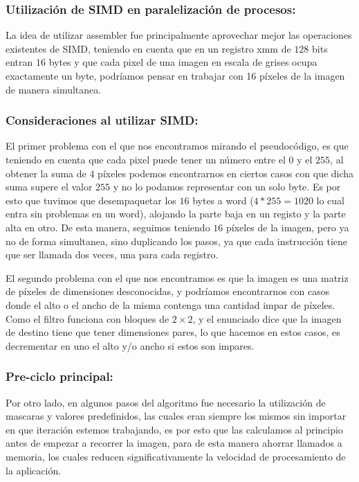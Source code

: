 \subsubsection{Utilización de SIMD en paralelización de procesos:}

La idea de utilizar assembler fue principalmente aprovechar mejor las operaciones existentes de SIMD, teniendo en cuenta que en un registro xmm de $128$ bits entran $16$ bytes y que cada pixel de una imagen en escala de grises ocupa exactamente un byte, podríamos pensar en trabajar con 16 píxeles de la imagen de manera simultanea. 


\subsubsection{Consideraciones al utilizar SIMD:}

El primer problema con el que nos encontramos mirando el pseudocódigo, es que teniendo en cuenta que cada pixel puede tener un número entre el $0$ y el $255$, al obtener la suma de $4$ píxeles podemos encontrarnos en ciertos casos con que dicha suma supere el valor $255$ y no lo podamos representar con un solo byte. Es por esto que tuvimos que desempaquetar los $16$ bytes a word ($4*255 = 1020$ lo cual entra sin problemas en un word), alojando la parte baja en un registo y la parte alta en otro. De esta manera, seguimos teniendo $16$ píxeles de la imagen, pero ya no de forma simultanea, sino duplicando los pasos, ya que cada instrucción tiene que ser llamada dos veces, una para cada registro.

El segundo problema con el que nos encontramos es que la imagen es una matriz de píxeles de dimensiones desconocidas, y podríamos encontrarnos con casos donde el alto o el ancho de la misma contenga una cantidad impar de píxeles. Como el filtro funciona con bloques de $2 \times 2$, y el enunciado dice que la imagen de destino tiene que tener dimensiones pares, lo que hacemos en estos casos, es decrementar en uno el alto y/o ancho si estos son impares.


\subsubsection{Pre-ciclo principal:}

Por otro lado, en algunos pasos del algoritmo fue necesario la utilización de mascaras y valores predefinidos, las cuales eran siempre los mismos sin importar en que iteración estemos trabajando, es por esto que las calculamos al principio antes de empezar a recorrer la imagen, para de esta manera ahorrar llamados a memoria, los cuales reducen significativamente la velocidad de procesamiento de la aplicación.

